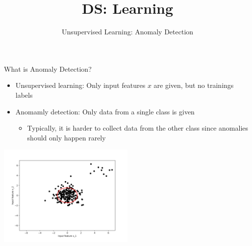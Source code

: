 \documentclass[aspectratio=169]{../latex_main/tntbeamer}  %
\title[Anomaly Detection]{DS: Learning}
\subtitle{Unsupervised Learning: Anomaly Detection}
\begin{document}
	
    \maketitle
    
    \begin{frame}[c]{What is Anomaly Detection?}
        \begin{itemize}
            \item Unsupervised learning: Only input features $x$ are given, but no trainings labels
            \item Anomamly detection: Only data from a single class is given
            \begin{itemize}
                \item Typically, it is harder to collect data from the other class since anomalies should only happen rarely
            \end{itemize}
        \end{itemize} 

        \centering
        \includegraphics[width=0.5\textwidth]{figure/anomaly}

        
        
        
        

\end{frame}
\end{document}
